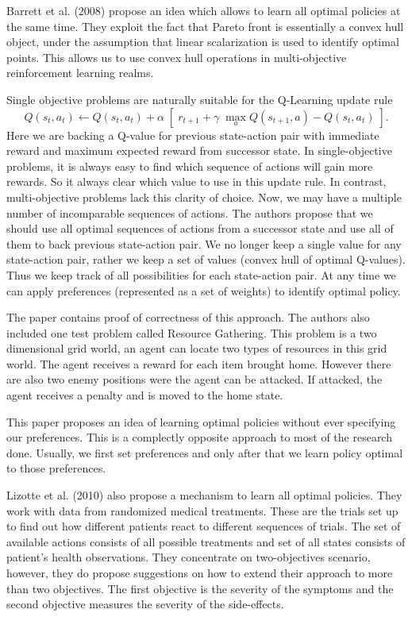 Barrett et al. (2008) \nocite{barrett2008learning} propose an idea which allows to learn all optimal policies at the same time. They exploit the fact that Pareto front is essentially a convex hull object, under the assumption that linear scalarization is used to identify optimal points. This allows us to use convex hull operations in multi-objective reinforcement learning realms.

Single objective problems are naturally suitable for the Q-Learning update rule
$$ Q(s_{t},a_{t}) \leftarrow Q(s_{t},a_{t}) + \alpha \; \left[\;r_{t+1} + \gamma\; \max_{a}Q(s_{t+1},a) - Q(s_{t},a_{t})\;\right]. $$
Here we are backing a Q-value for previous state-action pair with immediate reward and maximum expected reward from successor state. In single-objective problems, it is always easy to find which sequence of actions will gain more rewards. So it always clear which value to use in this update rule. In contrast, multi-objective problems lack this clarity of choice. Now, we may have a multiple number of incomparable sequences of actions. The authors propose that we should use all optimal sequences of actions from a successor state and use all of them to back previous state-action pair. We no longer keep a single value for any state-action pair, rather we keep a set of values (convex hull of optimal Q-values). Thus we keep track of all possibilities for each state-action pair. At any time we can apply preferences (represented as a set of weights) to identify optimal policy.

The paper contains proof of correctness of this approach. The authors also included one test problem called Resource Gathering. This problem is a two dimensional grid world, an agent can locate two types of resources in this grid world. The agent receives a reward for each item brought home. However there are also two enemy positions were the agent can be attacked. If attacked, the agent receives a penalty and is moved to the home state.

This paper proposes an idea of learning optimal policies without ever specifying our preferences. This is a complectly opposite approach to most of the research done. Usually, we first set preferences and only after that we learn policy optimal to those preferences.

Lizotte et al. (2010) \nocite{lizotte2010efficient} also propose a mechanism to learn all optimal policies. They work with data from randomized medical treatments. These are the trials set up to find out how different patients react to different sequences of trials. The set of available actions consists of all possible treatments and set of all states consists of patient's health observations. They concentrate on two-objectives scenario, however, they do propose suggestions on how to extend their approach to more than two objectives. The first objective is the severity of the symptoms and the second objective measures the severity of the side-effects. \\

